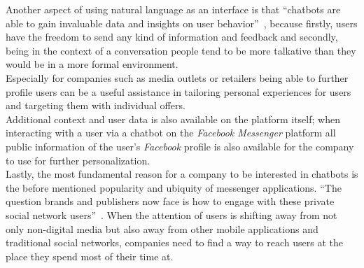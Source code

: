 Another aspect of using natural language as an interface is that ``chatbots are able to gain invaluable data and insights on user behavior''~\cite{drum},
because firstly, users have the freedom to send any kind of information and feedback and
secondly, being in the context of a conversation people tend to be more talkative than they would be in a more formal environment.
\\
Especially for companies such as media outlets or retailers being able to further profile users can be a useful assistance in tailoring personal experiences for users and targeting them with individual offers.
\\
Additional context and user data is also available on the platform itself;
when interacting with a user via a chatbot on the \emph{Facebook Messenger} platform all public information of the user's \emph{Facebook} profile is also available for the company to use for further personalization.
\\

Lastly, the most fundamental reason for a company to be interested in chatbots is the before mentioned popularity and ubiquity of messenger applications.
``The question brands and publishers now face is how to engage with these private social network users''~\cite{drum}.
When the attention of users is shifting away from not only non-digital media but also away from other mobile applications
and traditional social networks, companies need to find a way to reach users at the place they spend most of their time at.
